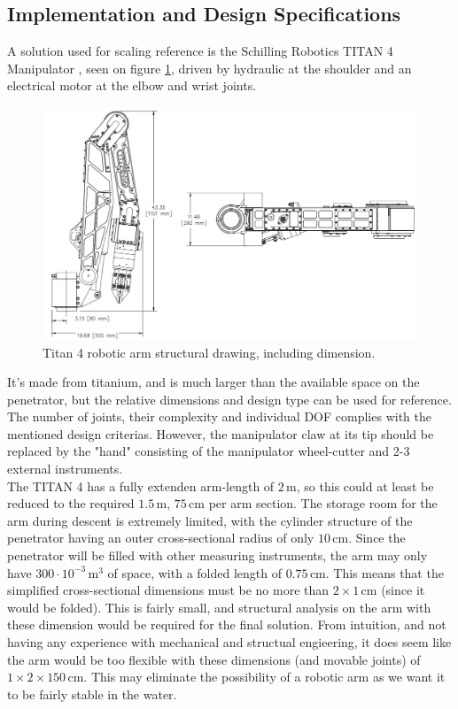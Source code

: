 \subsection{Implementation and Design Specifications}
A solution used for scaling reference is the Schilling Robotics TITAN 4 Manipulator \cite{Titan4}, seen on figure \ref{fig:titan4}, driven by hydraulic at the shoulder and an electrical motor at the elbow and wrist joints.
\begin{figure}[htb]
	\centering
	\includegraphics[width=1\textwidth]{figures/Rasmus/Titan4}
	\caption{Titan 4 robotic arm structural drawing, including dimension.
	\label{fig:titan4}}
\end{figure}
 It's made from titanium, and is much larger than the available space on the penetrator, but the relative dimensions and design type can be used for reference. The number of joints, their complexity and individual DOF complies with the mentioned design criterias. However, the manipulator claw at its tip should be replaced by the "hand" consisting of the manipulator wheel-cutter and 2-3 external instruments.\\
The TITAN 4 has a fully extenden arm-length of $2\,\mathrm{m}$, so this could at least be reduced to the required $\mathbf{1.5\,\mathrm{m}}$, $75\,\mathrm{cm}$ per arm section. The storage room for the arm during descent is extremely limited, with the cylinder structure of the penetrator having an outer cross-sectional radius of only $10\,\mathrm{cm}$. Since the penetrator will be filled with other measuring instruments, the arm may only have $300\cdot10^{-3} \,\mathrm{m^3}$ of space, with a folded length of $0.75\,\mathrm{cm}$. This means that the simplified  cross-sectional dimensions must be no more than $2\times 1\,\mathrm{cm}$ (since it would be folded). This is fairly small, and structural analysis on the arm with these dimension would be required for the final solution. From intuition, and not having any experience with mechanical and structual engieering, it does seem like the arm would be too flexible with these dimensions (and movable joints) of $1\times 2\times 150\,\mathrm{cm}$. This may eliminate the possibility of a robotic arm as we want it to be fairly stable in the water.\\ 
